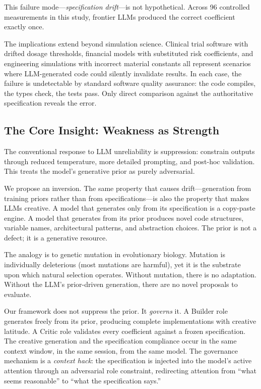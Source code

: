 \documentclass[11pt,a4paper]{article}
\begin{document}
This failure mode---\textit{specification drift}---is not hypothetical. Across 96 controlled measurements in this study, frontier LLMs produced the correct coefficient exactly once.

The implications extend beyond simulation science. Clinical trial software with drifted dosage thresholds, financial models with substituted risk coefficients, and engineering simulations with incorrect material constants all represent scenarios where LLM-generated code could silently invalidate results. In each case, the failure is undetectable by standard software quality assurance: the code compiles, the types check, the tests pass. Only direct comparison against the authoritative specification reveals the error.

\subsection{The Core Insight: Weakness as Strength}

The conventional response to LLM unreliability is suppression: constrain outputs through reduced temperature, more detailed prompting, and post-hoc validation. This treats the model's generative prior as purely adversarial.

We propose an inversion. The same property that causes drift---generation from training priors rather than from specifications---is also the property that makes LLMs creative. A model that generates only from its specification is a copy-paste engine. A model that generates from its prior produces novel code structures, variable names, architectural patterns, and abstraction choices. The prior is not a defect; it is a generative resource.

The analogy is to genetic mutation in evolutionary biology. Mutation is individually deleterious (most mutations are harmful), yet it is the substrate upon which natural selection operates. Without mutation, there is no adaptation. Without the LLM's prior-driven generation, there are no novel proposals to evaluate.

Our framework does not suppress the prior. It \textit{governs} it. A Builder role generates freely from its prior, producing complete implementations with creative latitude. A Critic role validates every coefficient against a frozen specification. The creative generation and the specification compliance occur in the same context window, in the same session, from the same model. The governance mechanism is a \textit{context hack}: the specification is injected into the model's active attention through an adversarial role constraint, redirecting attention from ``what seems reasonable'' to ``what the specification says.''
\end{document}
